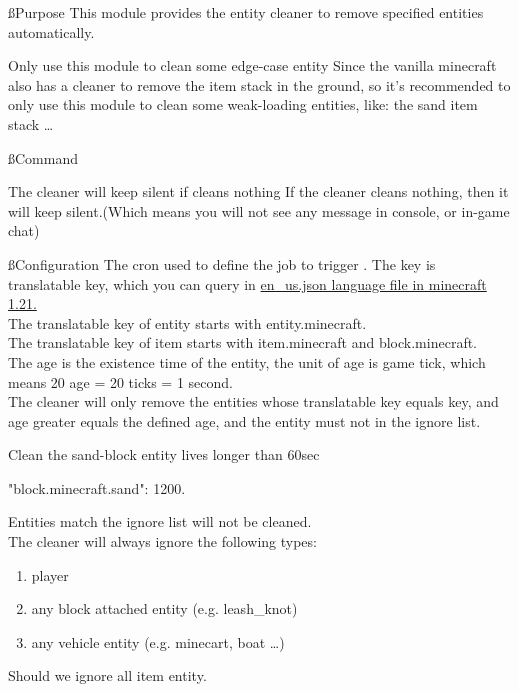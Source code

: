 
\ss{Purpose}
This module provides the entity cleaner to remove specified entities automatically.

\begin{note}{Only use this module to clean some edge-case entity}
    Since the vanilla minecraft also has a cleaner to remove the item stack in the ground, so it's recommended to only use this module to clean some weak-loading entities, like: the sand item stack \ldots
\end{note}


\ss{Command}
\begin{note}{The cleaner will keep silent if cleans nothing}
    If the cleaner cleans nothing, then it will keep silent.(Which means you will not see any message in console, or in-game chat)
\end{note}

\ss{Configuration}
The cron used to define the job to trigger .
The key is translatable key, which you can query in \href{https://github.com/sakurawald/fuji-fabric/blob/dev/.github/files/en_us.json}{en\_us.json language file in minecraft 1.21.} \\
The translatable key of entity starts with entity.minecraft. \\
The translatable key of item starts with item.minecraft and block.minecraft. \\
The age is the existence time of the entity, the unit of age is game tick, which means 20 age = 20 ticks = 1 second. \\
The cleaner will only remove the entities whose translatable key equals key, and age greater equals the defined age, and the entity must not in the ignore list.

\begin{example}{Clean the sand-block entity lives longer than 60sec}
    \begin{json}
        "block.minecraft.sand": 1200.
    \end{json}
\end{example}

Entities match the ignore list will not be cleaned. \\
The cleaner will always ignore the following types:
\begin{enumerate}
    \item player
    \item any block attached entity (e.g. leash\_knot)
    \item any vehicle entity (e.g. minecart, boat \ldots)
\end{enumerate}
Should we ignore all item entity.

